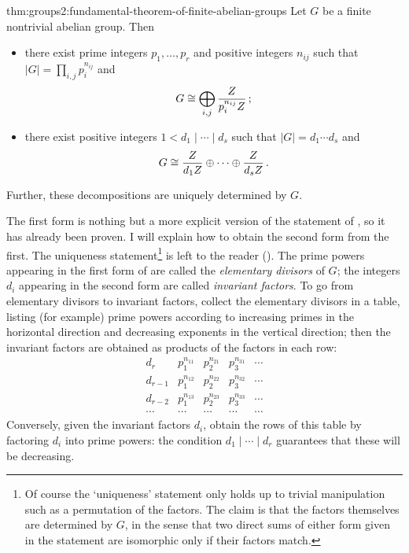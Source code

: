 \begin{thm}{}{thm:groups2:fundamental-theorem-of-finite-abelian-groups}
  Let $G$ be a finite nontrivial abelian group. Then
  \begin{itemize}
  \item there exist prime integers $p_1, \dots, p_r$ and positive
    integers $n_{ij}$ such that $|G| = \prod_{i,j} p_i^{n_{ij}}$ and
    \[G \cong \bigoplus_{i,j} \frac{Z}{p_i^{n_{ij}}Z}\,;\]
  \item there exist positive integers $1 < d_1 \mid \cdots \mid d_s$
    such that $|G| = d_1 \cdots d_s$ and
    \[G \cong \frac{Z}{d_1Z} \oplus \cdots \oplus
      \frac{Z}{d_sZ}\,.\]
  \end{itemize}
  Further, these decompositions are uniquely determined by $G$.
\end{thm}
The first form is nothing but a more explicit version of the statement
of , so it has already been proven. I will
explain how to obtain the second form from the first. The uniqueness
statement\footnote{Of course the `uniqueness' statement only holds up
  to trivial manipulation such as a permutation of the factors. The
  claim is that the factors themselves are determined by $G$, in the
  sense that two direct sums of either form given in the statement are
  isomorphic only if their factors match.} is left to the reader
().  The prime powers
appearing in the first form of  are called the
\emph{elementary divisors} of $G$; the integers $d_i$ appearing in the
second form are called \emph{invariant factors}. To go from elementary
divisors to invariant factors, collect the elementary divisors in a
table, listing (for example) prime powers according to increasing
primes in the horizontal direction and decreasing exponents in the
vertical direction; then the invariant factors are obtained as
products of the factors in each row:
\[
  \begin{array}{c||c|c|c|c}
    d_r     & p_1^{n_{11}} & p_2^{n_{21}} & p_3^{n_{31}} & \cdots \\
    d_{r-1} & p_1^{n_{12}} & p_2^{n_{22}} & p_3^{n_{32}} & \cdots \\
    d_{r-2} & p_1^{n_{13}} & p_2^{n_{23}} & p_3^{n_{33}} & \cdots \\
    \cdots  & \cdots       & \cdots       & \cdots       & \cdots
  \end{array}
\]
Conversely, given the invariant factors $d_i$, obtain the rows of this
table by factoring $d_i$ into prime powers: the condition
$d_1 \mid \cdots \mid d_r$ guarantees that these will be decreasing.


